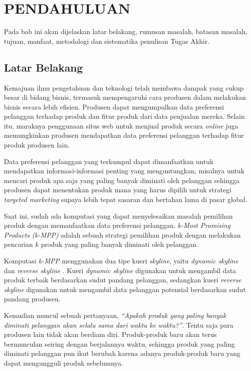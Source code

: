 \chapter{PENDAHULUAN}
\tab Pada bab ini akan dijelaskan latar belakang, rumusan masalah, batasan masalah, tujuan, manfaat, metodologi dan sistematika penulisan Tugas Akhir.

\section{Latar Belakang}
\tab Kemajuan ilmu pengetahuan dan teknologi telah membawa dampak yang cukup besar di bidang bisnis, termasuk mempengaruhi cara produsen dalam melakukan bisnis secara lebih efisien. Produsen dapat mengumpulkan data preferensi pelanggan terhadap produk dan fitur produk dari data penjualan mereka. Selain itu, maraknya penggunaan situs web untuk menjual produk secara \textit{online} juga memungkinkan produsen mendapatkan data preferensi pelanggan terhadap fitur produk produsen lain.\

Data preferensi pelanggan yang terkumpul dapat dimanfaatkan untuk mendapatkan informasi-informasi penting yang menguntungkan, misalnya untuk mencari produk apa saja yang paling banyak diminati oleh pelanggan sehingga produsen dapat menentukan produk mana yang harus dipilih untuk strategi \textit{targeted marketing} supaya lebih tepat sasaran dan bertahan lama di pasar global.

Saat ini, sudah ada komputasi yang dapat menyelesaikan masalah pemilihan
produk dengan memanfaatkan data preferensi pelanggan. \textit{k-Most Promising Products (k-MPP)} \cite{kmpp} adalah sebuah strategi pemilihan produk dengan melakukan pencarian $k$ produk yang paling banyak diminati oleh pelanggan.

Komputasi \textit{k-MPP} menggunakan dua tipe kueri \textit{skyline}, yaitu \textit{dynamic skyline} \cite{dynamic-skyline} dan \textit{reverse skyline} \cite{reverse-skyline}. Kueri \textit{dynamic skyline} digunakan untuk mengambil data produk terbaik berdasarkan sudut pandang pelanggan, sedangkan kueri \textit{reverse skyline} digunakan untuk mengambil data pelanggan potensial berdasarkan sudut pandang produsen.

Kemudian muncul sebuah pertanyaan, \textit{“Apakah produk yang paling banyak diminati pelanggan akan selalu sama dari waktu ke waktu?”}. Tentu saja para produsen lain tidak akan berdiam diri. Produk-produk baru akan terus bermunculan seiring dengan berjalannya waktu, sehingga produk yang paling diminati pelanggan pun ikut berubah karena adanya produk-produk baru yang dapat mengungguli produk sebelumnya.

